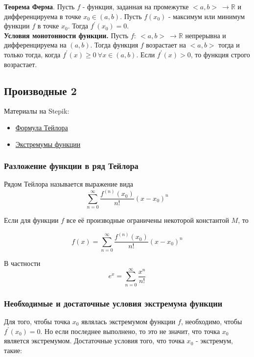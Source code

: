 \documentclass{article}
\begin{document}
\textbf{Теорема Ферма}. Пусть $f$ - функция, заданная на промежутке $<a, b> \ \to \mathbb{R}$ и дифференцируема в точке $x_0 \in (a, b)$. Пусть $f(x_0)$ - максимум или минимум функции $f$ в точке $x_0$. Тогда $f^{\prime}(x_0) = 0$. \\

\textbf{Условия монотонности функции.} Пусть $f: \ <a, b> \ \to \mathbb{R}$ непрерывна и дифференцируема на $(a, b)$. Тогда функция $f$ возрастает на $<a, b>$ тогда и только тогда, когда $f^{\prime}(x) \ge 0 \ \forall x \in (a, b)$. Если $f^{\prime}(x) > 0$, то функция строго возрастает.

\subsection{Производные 2}

Материалы на Stepik:

\begin{itemize}
	\item \href{https://stepik.org/lesson/32797/step/1}{Формула Тейлора}
	\item \href{https://stepik.org/lesson/28372/step/2}{Экстремумы функции}
\end{itemize}

\subsubsection{Разложение функции в ряд Тейлора}

Рядом Тейлора называется выражение вида $$ \sum_{n = 0}^{\infty} \frac{f^{(n)}(x_0)}{n!} (x - x_0)^n $$

Если для функции $f$ все её производные ограничены некоторой константой $M$, то 

$$ f(x) = \sum_{n = 0}^{\infty} \frac{f^{(n)}(x_0)}{n!} (x - x_0)^n $$

В частности $$e^x = \sum_{n = 0}^{\infty} \frac{x^n}{n!}$$

\subsubsection{Необходимые и достаточные условия экстремума функции}

Для того, чтобы точка $x_0$ являлась экстремумом функции $f$, необходимо, чтобы $f^{\prime}(x_0) = 0$. Но если последнее выполнено, то это не значит, что точка $x_0$ является экстремумом. Достаточные условия того, что точка $x_0$ - экстремум, такие:
\end{document}
